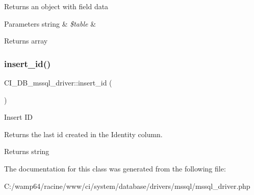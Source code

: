 Returns an object with field data


\begin{DoxyParams}[1]{Parameters}
string & {\em \$table} & \\
\hline
\end{DoxyParams}
\begin{DoxyReturn}{Returns}
array 
\end{DoxyReturn}
\mbox{\label{class_c_i___d_b__mssql__driver_a720c715b760f74b63bb40184250daba1}} 
\subsubsection{\texorpdfstring{insert\+\_\+id()}{insert\_id()}}
{\footnotesize\ttfamily C\+I\+\_\+\+D\+B\+\_\+mssql\+\_\+driver\+::insert\+\_\+id (\begin{DoxyParamCaption}{ }\end{DoxyParamCaption})}

Insert ID

Returns the last id created in the Identity column.

\begin{DoxyReturn}{Returns}
string 
\end{DoxyReturn}


The documentation for this class was generated from the following file\+:\begin{DoxyCompactItemize}
\item 
C\+:/wamp64/racine/www/ci/system/database/drivers/mssql/mssql\+\_\+driver.\+php\end{DoxyCompactItemize}
